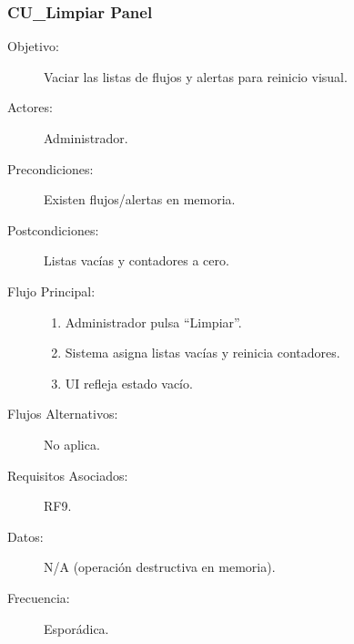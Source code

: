 \subsubsection{CU\_Limpiar Panel}
\begin{description}
  \item[Objetivo:] Vaciar las listas de flujos y alertas para reinicio visual.
  \item[Actores:] Administrador.
  \item[Precondiciones:] Existen flujos/alertas en memoria.
  \item[Postcondiciones:] Listas vacías y contadores a cero.
  \item[Flujo Principal:]
    \begin{enumerate}
      \item Administrador pulsa “Limpiar”.
      \item Sistema asigna listas vacías y reinicia contadores.
      \item UI refleja estado vacío.
    \end{enumerate}
  \item[Flujos Alternativos:] No aplica.
  \item[Requisitos Asociados:] RF9.
  \item[Datos:] N/A (operación destructiva en memoria).
  \item[Frecuencia:] Esporádica.
\end{description}

